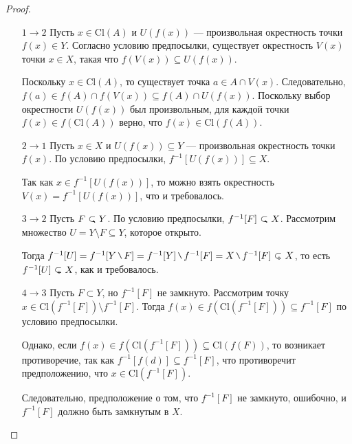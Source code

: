 \begin{proof} \ 
	\begin{itemize}
		\item[ \(\boxed{1 \longrightarrow 2}\)] Пусть \( x \in \mathrm{Cl}(A) \) и \( U(f(x)) \) — произвольная окрестность точки \( f(x) \in Y \). Согласно условию предпосылки, существует окрестность \( V(x) \) точки \( x \in X \), такая что \( f(V(x)) \subseteq U(f(x)) \).

		Поскольку \( x \in \mathrm{Cl}(A) \), то существует точка \( a \in A \cap V(x) \). Следовательно, \( f(a) \in f(A) \cap f(V(x)) \subseteq f(A) \cap U(f(x)) \). Поскольку выбор окрестности \( U(f(x)) \) был произвольным, для каждой точки \( f(x) \in f(\mathrm{Cl}(A)) \) верно, что \( f(x) \in \mathrm{Cl}(f(A)) \).
		
		\item[ \(\boxed{2 \longrightarrow 1}\)]  Пусть \( x \in X \) и \( U(f(x)) \subseteq Y \) — произвольная окрестность точки \( f(x) \). По условию предпосылки, \( f^{-1}[U(f(x))] \subseteq X \).

		Так как \( x \in f^{-1}[U(f(x))] \), то можно взять окрестность \( V(x) = f^{-1}[U(f(x))] \), что и требовалось.
		
		\item[ \(\boxed{3 \longrightarrow 2}\)] Пусть \( F \closed Y \). По условию предпосылки, \( f^{-1}[F] \closed X \). Рассмотрим множество \( U = Y \setminus F \subseteq Y \), которое открыто.

		Тогда \( f^{-1}[U] = f^{-1}[Y \setminus F] = f^{-1}[Y] \setminus f^{-1}[F] = X \setminus f^{-1}[F] \open X \), то есть \( f^{-1}[U] \open X \), как и требовалось.		
		\item[ \(\boxed{4 \longrightarrow 3}\)] Пусть \( F \subset Y \), но \( f^{-1}[F] \) не замкнуто. Рассмотрим точку \( x \in \mathrm{Cl}(f^{-1}[F]) \setminus f^{-1}[F] \). Тогда \( f(x) \in f(\mathrm{Cl}(f^{-1}[F])) \subseteq f^{-1}[F] \) по условию предпосылки.

		Однако, если \( f(x) \in f(\mathrm{Cl}(f^{-1}[F])) \subseteq \mathrm{Cl}(f(F)) \), то возникает противоречие, так как \( f^{-1}[f(d)] \subseteq f^{-1}[F] \), что противоречит предположению, что \( x \in \mathrm{Cl}(f^{-1}[F]) \).
		
		Следовательно, предположение о том, что \( f^{-1}[F] \) не замкнуто, ошибочно, и \( f^{-1}[F] \) должно быть замкнутым в \( X \).		
	\end{itemize}
\end{proof}

